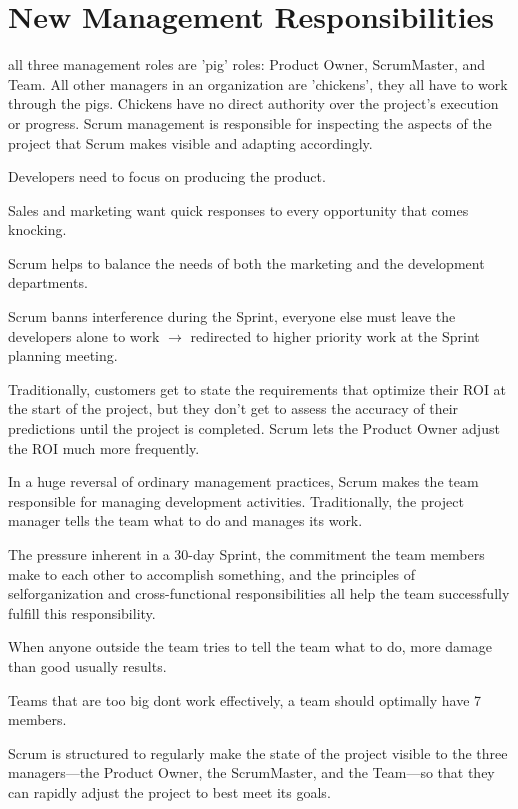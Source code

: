 \pagebreak
\chapter{New Management Responsibilities}

all three management roles are 'pig' roles: Product Owner, ScrumMaster, and Team. All other
managers in an organization are 'chickens', they all have to work through the pigs.
Chickens have no direct authority over the project’s execution or progress. Scrum management is responsible for inspecting the aspects of the project that Scrum makes visible and adapting accordingly.

Developers need to focus on producing the product. 

Sales and marketing want quick responses to every opportunity that comes knocking.

Scrum helps to balance the needs of both the marketing and the development departments.

Scrum banns interference during the Sprint, everyone else must leave the developers alone to work $\rightarrow$ redirected to higher priority work at the Sprint planning meeting.

Traditionally, customers get to state the requirements that optimize their ROI at the start of the project, but they don’t get to assess the accuracy of their predictions until the project is completed. Scrum lets the Product Owner adjust the ROI much more frequently.

In a huge reversal of ordinary management practices, Scrum makes the team responsible for managing development activities. Traditionally, the project manager tells the team what to do and manages its work.

The pressure inherent in a 30-day Sprint, the commitment the team members make to each other to accomplish something, and the principles of selforganization and cross-functional responsibilities all help the team successfully fulfill this responsibility.

When anyone outside the team tries to tell the team what to do, more damage than good usually results.

Teams that are too big dont work effectively, a team should optimally have 7 members.


Scrum is structured to regularly make the state of the project visible to the three managers—the Product Owner, the ScrumMaster, and the Team—so that they can rapidly adjust the project to best meet its goals.




